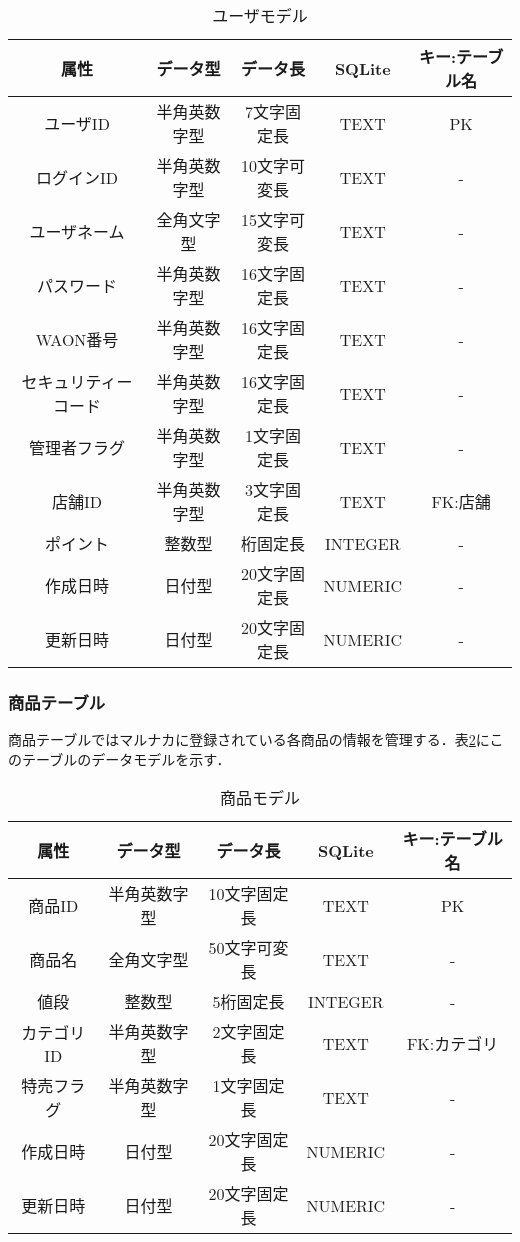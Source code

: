 \documentclass[a4j]{jarticle}
\begin{document}
\begin{table}[H]
\caption{ユーザモデル}
\label{tab:DB2}
\begin{center}
\begin{tabular}{|c|c|c|c|c|}
\hline
属性　&データ型&データ長&SQLite&キー:テーブル名\\ \hline\hline
ユーザID &半角英数字型&7文字固定長&TEXT&PK  \\ \hline
ログインID &半角英数字型&10文字可変長&TEXT&- \\ \hline
ユーザネーム &全角文字型&15文字可変長&TEXT&- \\ \hline
パスワード &半角英数字型&16文字固定長&TEXT&-  \\ \hline
WAON番号  &半角英数字型&16文字固定長&TEXT&-  \\ \hline
セキュリティーコード &半角英数字型&16文字固定長&TEXT&-  \\ \hline
管理者フラグ &半角英数字型&1文字固定長&TEXT&-  \\ \hline
 店舗ID &半角英数字型&3文字固定長&TEXT&FK:店舗 \\ \hline
ポイント  &整数型&桁固定長&INTEGER&- \\ \hline
 作成日時  &日付型&20文字固定長&NUMERIC&- \\ \hline
更新日時 &日付型&20文字固定長&NUMERIC&-  \\ \hline
\end{tabular}
\end{center}
\end{table}
\subsubsection{商品テーブル}
商品テーブルではマルナカに登録されている各商品の情報を管理する．表\ref{tab:DB3}にこのテーブルのデータモデルを示す．
\begin{table}[H]
\caption{商品モデル}
\label{tab:DB3}
\begin{center}
\begin{tabular}{|c|c|c|c|c|}
\hline
属性　&データ型&データ長&SQLite&キー:テーブル名\\ \hline\hline
商品ID &半角英数字型&10文字固定長&TEXT&PK \\ \hline
商品名&全角文字型&50文字可変長&TEXT&- \\ \hline
値段&整数型&5桁固定長&INTEGER&-\\ \hline
カテゴリID &半角英数字型&2文字固定長&TEXT&FK:カテゴリ \\ \hline
特売フラグ  &半角英数字型&1文字固定長&TEXT&-  \\ \hline
作成日時  &日付型&20文字固定長&NUMERIC&- \\ \hline
更新日時 &日付型&20文字固定長&NUMERIC&-  \\ \hline
\end{tabular}
\end{center}
\end{table}
\end{document}
